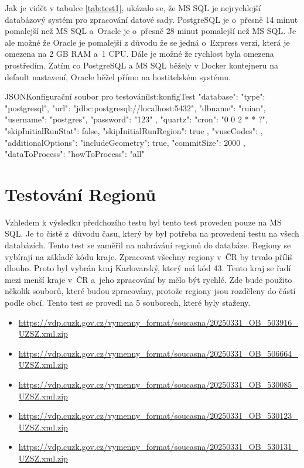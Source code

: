 Jak je vidět v tabulce \ref{tab:test1}, ukázalo se, že MS SQL je nejrychlejší databázový systém pro zpracování datové sady.
PostgreSQL je o~přesně 14 minut pomalejší než MS SQL a~Oracle je o~přesně 28 minut pomalejší než MS SQL.
Je ale možné že Oracle je pomalejší z důvodu že se jedná o~Express verzi, která je omezena na 2 GB RAM a~1 CPU.
Dále je možné že rychlost byla omezena prostředím. Zatím co PostgreSQL a MS SQL běžely v Docker kontejneru na default nastavení,
Oracle běžel přímo na hostitelském systému.

\begin{code}{JSON}{Konfigurační soubor pro testování}{lst:konfigTest}
  {
    "database": {
      "type": "postgresql",
      "url": "jdbc:postgresql://localhost:5432",
      "dbname": "ruian",
      "username": "postgres",
      "password": "123"
    },
    "quartz": {
      "cron": "0 0 2 * * ?",
      "skipInitialRunStat": false,
      "skipInitialRunRegion": true
    },
    "vuscCodes": {},
    "additionalOptions": {
      "includeGeometry": true,
      "commitSize": 2000
    },
    "dataToProcess": {
      "howToProcess": "all"
    }
  }
\end{code}

\section{Testování Regionů}
Vzhledem k výsledku předchozího testu byl tento test proveden pouze na MS SQL.
Je to čistě z~důvodu času, který by byl potřeba na provedení testu na všech databázích.
Tento test se zaměřil na nahrávání regionů do databáze.
Regiony se vybírají na základě kódu kraje. Zpracovat všechny regiony v~ČR by trvalo příliš dlouho.
Proto byl vybrán kraj Karlovarský, který má kód 43.
Tento kraj se řadí mezi menší kraje v~ČR a~jeho zpracování by mělo být rychlé.
Zde bude použito několik souborů, které budou zpracovány, protože regiony jsou rozděleny do částí podle obcí.
Tento test se provedl na 5 souborech, které byly staženy.
\begin{itemize}
  \item \url{https://vdp.cuzk.gov.cz/vymenny_format/soucasna/20250331_OB_503916_UZSZ.xml.zip}
  \item \url{https://vdp.cuzk.gov.cz/vymenny_format/soucasna/20250331_OB_506664_UZSZ.xml.zip}
  \item \url{https://vdp.cuzk.gov.cz/vymenny_format/soucasna/20250331_OB_530085_UZSZ.xml.zip}
  \item \url{https://vdp.cuzk.gov.cz/vymenny_format/soucasna/20250331_OB_530123_UZSZ.xml.zip}
  \item \url{https://vdp.cuzk.gov.cz/vymenny_format/soucasna/20250331_OB_530131_UZSZ.xml.zip}
\end{itemize}

